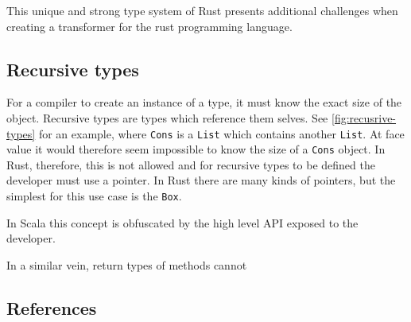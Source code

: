 \documentclass[ oneside,%
                    author={James Elgar},
                    degree={MEng},
                     title={Bidirectional transformer between functional and \\ object-oriented programming in Rust},
                  subtitle={}]{dissertation}
\begin{document}
This unique and strong type system of Rust presents additional challenges when creating a transformer for the rust programming language. 

\subsection{Recursive types}

For a compiler to create an instance of a type, it must know the exact size of the object. Recursive types are types which reference them selves. See \autoref{fig:recusrive-types} for an example, where \verb|Cons| is a \verb|List| which contains another \verb|List|. At face value it would therefore seem impossible to know the size of a \verb|Cons| object. In Rust, therefore, this is not allowed and for recursive types to be defined the developer must use a pointer. In Rust there are many kinds of pointers, but the simplest for this use case is the \verb|Box|.

In Scala this concept is obfuscated by the high level API exposed to the developer.

In a similar vein, return types of methods cannot  

\subsection{References}





\end{document}
